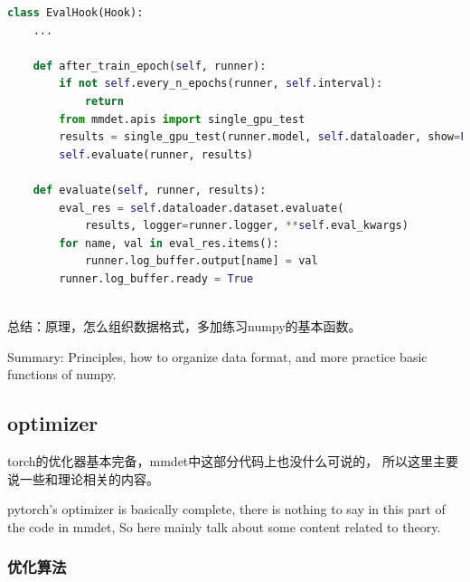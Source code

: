 \documentclass[UTF8]{ctexart}
\begin{document}
\lstset{style=mystyle}
\begin{lstlisting}[language=Python]
class EvalHook(Hook):
    ...
    
    def after_train_epoch(self, runner):
        if not self.every_n_epochs(runner, self.interval):
            return
        from mmdet.apis import single_gpu_test
        results = single_gpu_test(runner.model, self.dataloader, show=False)
        self.evaluate(runner, results)

    def evaluate(self, runner, results):
        eval_res = self.dataloader.dataset.evaluate(
            results, logger=runner.logger, **self.eval_kwargs)
        for name, val in eval_res.items():
            runner.log_buffer.output[name] = val
        runner.log_buffer.ready = True
    
\end{lstlisting}

总结：原理，怎么组织数据格式，多加练习numpy的基本函数。

Summary: Principles, how to organize data format, and more practice basic functions of numpy.
\subsection{optimizer}
torch的优化器基本完备，mmdet中这部分代码上也没什么可说的，
所以这里主要说一些和理论相关的内容。

pytorch's optimizer is basically complete, there is nothing to say in this part of the code in mmdet,
So here mainly talk about some content related to theory.

\subsubsection{优化算法}
\end{document}
